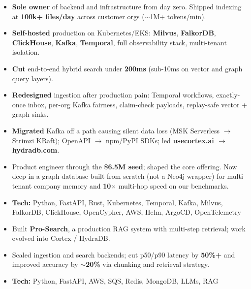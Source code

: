 \documentclass[10pt,a4paper,ragged2e]{altacv}
\begin{document}
\begin{itemize}[leftmargin=*]
    \item \textbf{Sole owner} of backend and infrastructure from day zero. Shipped indexing at \textbf{100k+ files/day} across customer orgs ($\sim$1M+ tokens/min).
    \item \textbf{Self-hosted} production on Kubernetes/EKS: \textbf{Milvus}, \textbf{FalkorDB}, \textbf{ClickHouse}, \textbf{Kafka}, \textbf{Temporal}, full observability stack, multi-tenant isolation.
    \item \textbf{Cut} end-to-end hybrid search under \textbf{200ms} (sub-10ms on vector and graph query layers).
    \item \textbf{Redesigned} ingestion after production pain: Temporal workflows, exactly-once inbox, per-org Kafka fairness, claim-check payloads, replay-safe vector + graph sinks.
    \item \textbf{Migrated} Kafka off a path causing silent data loss (MSK Serverless $\rightarrow$ Strimzi KRaft); OpenAPI $\rightarrow$ npm/PyPI SDKs; led \textbf{usecortex.ai $\rightarrow$ hydradb.com}.
    \item Product engineer through the \textbf{\$6.5M seed}; shaped the core offering. Now deep in a graph database built from scratch (not a Neo4j wrapper) for multi-tenant company memory and \textbf{10$\times$} multi-hop speed on our benchmarks.
    \item \textbf{Tech:} Python, FastAPI, Rust, Kubernetes, Temporal, Kafka, Milvus, FalkorDB, ClickHouse, OpenCypher, AWS, Helm, ArgoCD, OpenTelemetry
\end{itemize}
\vspace{-0.5em}
\divider
\vspace{-0.35em}

\begin{itemize}[leftmargin=*]
    \item Built \textbf{Pro-Search}, a production RAG system with multi-step retrieval; work evolved into Cortex / HydraDB.
    \item Scaled ingestion and search backends; cut p50/p90 latency by \textbf{50\%+} and improved accuracy by $\sim$\textbf{20\%} via chunking and retrieval strategy.
    \item \textbf{Tech:} Python, FastAPI, AWS, SQS, Redis, MongoDB, LLMs, RAG
\end{itemize}
\vspace{-0.5em}
\divider
\vspace{-0.35em}
\end{document}
